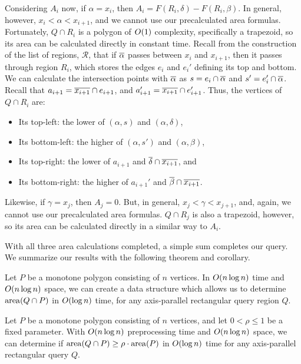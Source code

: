 Considering $A_i$ now, if $\alpha = x_i$, then $A_i = F(R_i, \delta) - F(R_i, \beta)$. 
In general, however, $x_i < \alpha < x_{i+1}$, and we cannot use our precalculated area formulas.
Fortunately, $Q \cap R_i$ is a polygon of $O\!\left(1\right)$ complexity, specifically a trapezoid, so its area can be calculated directly in constant time. 
Recall from the construction of the list of regions, $\mathcal{R}$, that if $\overline{\alpha}$ passes between $x_i$ and $x_{i+1}$, then it passes through region $R_i$, which stores the edges $e_i$ and $e_i'$ defining its top and bottom. 
We can calculate the intersection points with $\overline{\alpha}$ as $s = e_i \cap \overline{\alpha}$ and $s' = e_i' \cap \overline{\alpha}$.
Recall that $a_{i+1} = \overline{x_{i+1}} \cap e_{i+1}$, and $a_{i+1}' = \overline{x_{i+1}} \cap e_{i+1}'$.
Thus, the vertices of $Q \cap R_i$ are:
\begin{itemize}
 \item Its top-left: the lower of $(\alpha, s)$ and $(\alpha, \delta)$,

 \item Its bottom-left: the higher of $(\alpha, s')$ and $(\alpha, \beta)$,

 \item Its top-right: the lower of $a_{i+1}$ and $\overline{\delta} \cap \overline{x_{i+1}}$, and

 \item Its bottom-right: the higher of $a_{i+1}'$ and $\overline{\beta} \cap \overline{x_{i+1}}$.

\end{itemize}

Likewise, if $\gamma = x_j$, then $A_j = 0$. But, in general, $x_j < \gamma < x_{j+1}$, and, again, we cannot use our precalculated area formulas.
$Q \cap R_j$ is also a trapezoid, however, so its area can be calculated directly in a similar way to $A_i$.

With all three area calculations completed, a simple sum completes our query. We summarize our results with the following theorem and corollary.

\begin{theorem}
\label{th:monotonep:rect:area}
Let $P$ be a monotone polygon consisting of $n$ vertices. 
In $O\!\left(n \log{n}\right)$ time and $O\!\left(n \log{n}\right)$ space, we can create a data structure which allows us to determine $\operatorname{area}\!\left(Q \cap P\right)$ in $O\!\left(\log{n}\right)$ time, for any axis-parallel rectangular query region $Q$.
\end{theorem}

\begin{corollary}
\label{cor:monotonep:rect:mp}
Let $P$ be a monotone polygon consisting of $n$ vertices, and let $0 < \rho \leq 1$ be a fixed parameter.
With $O\!\left(n \log{n}\right)$ preprocessing time and $O\!\left(n \log{n}\right)$ space, we can determine if $\operatorname{area}\!\left(Q \cap P\right) \geq \rho \cdot \operatorname{area}\!\left(P\right)$ in $O\!\left(\log{n}\right)$ time for any axis-parallel rectangular query $Q$.
\end{corollary}


